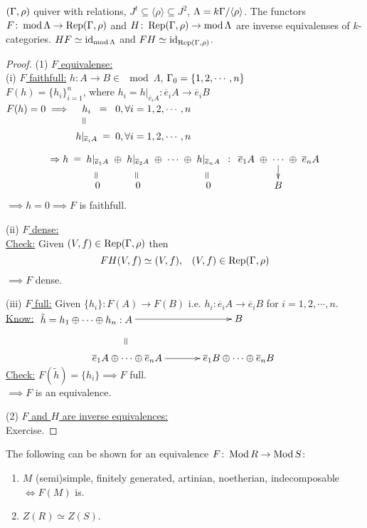 \begin{thm}
$(\Gamma, \rho)$ quiver with relations, $J^t \subseteq \langle \rho
\rangle \subseteq J^2$, $\Lambda = k\Gamma/\langle \rho \rangle$. The
functors $F\colon  \operatorname{mod}\nolimits \Lambda \to \operatorname{Rep}(\Gamma, \rho)$ and $H\colon
\operatorname{Rep}(\Gamma, \rho) \to \operatorname{mod}\nolimits \Lambda$ are inverse equivalenses of
$k$-categories. $HF \simeq \operatorname{id}\nolimits_{\operatorname{mod}\nolimits \Lambda}$ and $FH \simeq
\operatorname{id}\nolimits_{\operatorname{Rep}(\Gamma, \rho)}$. 
\end{thm}
\begin{proof}
(1) \underline{$F$ equivalense:}\\
(i) \underline{$F$ faithfull:} $h\colon A \to B \in \mod \Lambda$, $\Gamma_0 = \{ 1, 2, \cdots , n \}$\\
$F(h) = \{ h_i \}_{i=1}^n$, where $h_i = h|_{\overline{e}_iA} \colon  \overline{e}_iA \to \overline{e}_iB$\\
$F(h) = 0 \implies \xymatrix@C-1pc@R-1pc{
h_i \ar@{}[r]|-*[@]{=} & 0, \forall i = 1, 2, \cdots, n\\
h|_{\overline{e}_iA} \ar@{}[r]|-*[@]{=} \ar@{}[u]|-*[@]{=} & 0, \forall i = 1, 2, \cdots, n\\
}$\\
\[\xymatrix@C-1pc@R-1pc{
\Rightarrow h \ar@{}[r]|-*[@]{=} & h|_{\overline{e}_1A} \ar@{}[d]|-*[@]{=} \ar@{}[r]|-*[@]{\oplus} & h|_{\overline{e}_2A} \ar@{}[d]|-*[@]{=} \ar@{}[r]|-*[@]{\oplus}& \cdots \ar@{}[r]|-*[@]{\oplus}& h|_{\overline{e}_nA} \ar@{}[d]|-*[@]{=} \ar@{}[r]|-*[@]{:} & \overline{e}_1A \ar@{}[r]|-*[@]{\oplus} & \cdots \ar[d] \ar@{}[r]|-*[@]{\oplus} & \overline{e}_nA\\
              & 0                        & 0                        &        &   0                      &         & B
}\]
$\implies h=0 \implies F$ is faithfull.


(ii) \underline{$F$ dense:}\\
\underline{Check:} Given $(V, f) \in \operatorname{Rep}(\Gamma, \rho)$ then \[ FH(V, f) \simeq (V, f),\;\;\; (V, f) \in \operatorname{Rep}(\Gamma, \rho) \]
$\implies F$ dense.

(iii) \underline{$F$ full:} Given $\{ h_i \}\colon  F(A) \to F(B)$ i.e. $h_i \colon  \overline{e}_i A \to \overline{e}_iB$ for $i = 1, 2, \cdots , n$.\\
\underline{Know:} $\xymatrix{
*+[l]{\tilde{h} = h_1 \oplus \cdots \oplus h_n : A} \ar@{}[d]|-*[@]{=} \ar[r] & B\\
 \overline{e}_1A \oplus \cdots \oplus \overline{e}_nA \ar[r] & \overline{e}_1B \oplus \cdots \oplus \overline{e}_nB
}$\\
\underline{Check:} $F(\tilde{h}) = \{ h_i \} \implies F$ full.\\
$\implies F$ is an equivalence.

(2) \underline{$F$ and $H$ are inverse equivalences:}\\
Exercise.
\end{proof}

The following can be shown for an equivalence $F\colon  \operatorname{Mod} R \to \operatorname{Mod} S$:
\begin{enumerate}[\rm(a)]
\item $M$ (semi)simple, finitely generated, artinian, noetherian, indecomposable\\
$\iff F(M)$ is.
\item $Z(R) \simeq Z(S)$.
\end{enumerate}